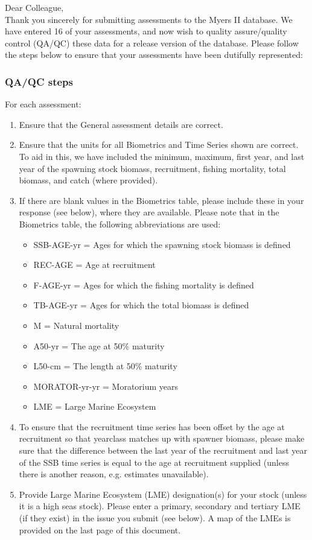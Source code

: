 \documentclass [a4paper, 10pt] {article}
\begin{document}
\noindent Dear Colleague,\\

\noindent Thank you sincerely for submitting assessments to the Myers II database. We have entered 16 of your assessments, and now wish to quality assure/quality control (QA/QC) these data for a release version of the database. Please follow the steps below to ensure that your assessments have been dutifully represented:
\subsubsection{QA/QC steps}
For each assessment:
\begin{enumerate}
\item Ensure that the General assessment details are correct.
\item Ensure that the units for all Biometrics and Time Series shown are correct. To aid in this, we have included the minimum, maximum, first year, and last year of the spawning stock biomass, recruitment, fishing mortality, total biomass, and  catch  (where provided). 
\item If there are blank values in the Biometrics table, please include these in your response (see below), where they are available.
Please note that in the Biometrics table, the following abbreviations are used:
\begin{itemize}
\item SSB-AGE-yr  = Ages for which the spawning stock biomass is defined
\item REC-AGE     = Age at recruitment
\item F-AGE-yr    = Ages for which the fishing mortality is defined 
\item TB-AGE-yr   = Ages for which the total biomass is defined
\item M      = Natural mortality
\item A50-yr      = The age at 50\% maturity
\item L50-cm      = The length at 50\% maturity
\item MORATOR-yr-yr = Moratorium years
\item LME = Large Marine Ecosystem\\
\end{itemize}
\item To ensure that the recruitment time series has been offset by the age at recruitment so that yearclass matches up with spawner biomass, please make sure that the difference between the last year of the recruitment and last year of the SSB time series is equal to the age at recruitment supplied (unless there is another reason, e.g. estimates unavailable). 
\item Provide Large Marine Ecosystem (LME) designation(s) for your stock (unless it is a high seas stock). Please enter a primary, secondary and tertiary LME (if they exist) in the issue you submit (see below). A map of the LMEs is provided on the last page of this document. 
\end{enumerate}
\vspace{-.25in}
\end{document}
